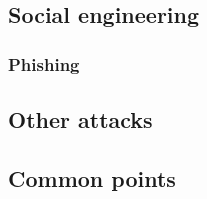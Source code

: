\subsection{Social engineering}

\subsubsection{Phishing}

\subsection{Other attacks}

\subsection{Common points}
